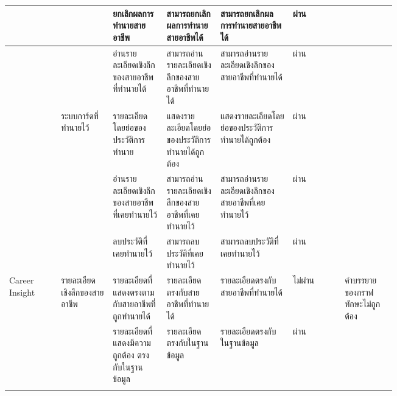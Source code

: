\begin{longtable}{>{\centering}p{0.1\linewidth}|p{0.1\linewidth}|p{0.1\linewidth}|p{0.1\linewidth}|p{0.14\linewidth}|>{\centering}p{0.1\linewidth}|p{0.1\linewidth}}
                       &                                  & ยกเลิกผลการทำนายสายอาชีพ                             & สามารถยกเลิกผลการทำนายสายอาชีพได้                                               & สามารถยกเลิกผลการทำนายสายอาชีพได้                                                      & ผ่าน      &                                                        \\ \cline{3-7}
                       &                                  & อ่านรายละเอียดเชิงลึกของสายอาชีพที่ทำนายได้                & สามารถอ่านรายละเอียดเชิงลึกของสายอาชีพที่ทำนายได้                                    & สามารถอ่านรายละเอียดเชิงลึกของสายอาชีพที่ทำนายได้                                           & ผ่าน      &                                                        \\
    \cline{2-7}
                       & ระบบการ์ดที่ทำนายไว้                  & รายละเอียดโดยย่อของประวัติการทำนาย                     & แสดงรายละเอียดโดยย่อของประวัติการทำนายได้ถูกต้อง                                    & แสดงรายละเอียดโดยย่อของประวัติการทำนายได้ถูกต้อง                                           & ผ่าน      &                                                        \\ \cline{3-7}
                       &                                  & อ่านรายละเอียดเชิงลึกของสายอาชีพที่เคยทำนายไว้             & สามารถอ่านรายละเอียดเชิงลึกของสายอาชีพที่เคยทำนายไว้                                 & สามารถอ่านรายละเอียดเชิงลึกของสายอาชีพที่เคยทำนายไว้                                        & ผ่าน      &                                                        \\ \cline{3-7}
                       &                                  & ลบประวัติที่เคยทำนายไว้                                 & สามารถลบประวัติที่เคยทำนายไว้                                                     & สามารถลบประวัติที่เคยทำนายไว้                                                            & ผ่าน      &                                                        \\ \hline
    Career Insight     & รายละเอียดเชิงลึกของสายอาชีพ         & รายละเอียดที่แสดงตรงตามกับสายอาชีพที่ถูกทำนายได้            & รายละเอียดตรงกับสายอาชีพที่ทำนายได้                                                & รายละเอียดตรงกับสายอาชีพที่ทำนายได้                                                       & ไม่ผ่าน    & คำบรรยายของกราฟทักษะไม่ถูกต้อง                              \\ \cline{3-7}
                       &                                  & รายละเอียดที่แสดงมีความถูกต้อง ตรงกับในฐานข้อมูล           & รายละเอียดตรงกับในฐานข้อมูล                                                     & รายละเอียดตรงกับในฐานข้อมูล                                                            & ผ่าน      &                                                        \\ \cline{3-7}

\end{longtable}
